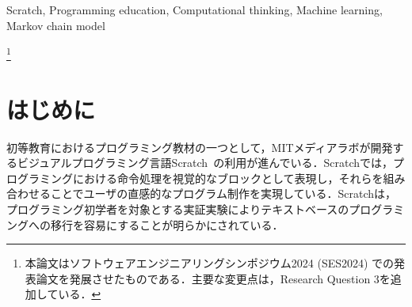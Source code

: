 \documentclass[submit]{ipsj}
\renewcommand{\thefootnote}{}%
\begin{document}
\begin{ekeyword}
Scratch, Programming education, Computational thinking, Machine learning, Markov chain model
\end{ekeyword}

\maketitle

\footnote[0]{本論文はソフトウェアエンジニアリングシンポジウム2024 (SES2024) での発表論文を発展させたものである．主要な変更点は，Research Question 3を追加している．}
\renewcommand{\thefootnote}{\arabic{footnote}}%

\section{はじめに}

初等教育におけるプログラミング教材の一つとして，MITメディアラボが開発するビジュアルプログラミング言語Scratch~\cite{Resnick_2009}の利用が進んでいる．Scratchでは，プログラミングにおける命令処理を視覚的なブロックとして表現し，それらを組み合わせることでユーザの直感的なプログラム制作を実現している．Scratchは，プログラミング初学者を対象とする実証実験によりテキストベースのプログラミングへの移行を容易にすることが明らかにされている\cite{TCE17-Weintrop}．
\end{document}
